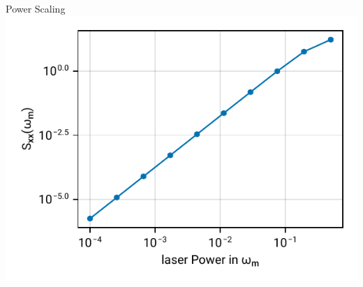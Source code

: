 \documentclass{beamer}
\begin{document}
\begin{frame}{Power Scaling}
	\centering
	\includegraphics{figures/03 power sweep.pdf}
\end{frame}


{
	\begin{frame}[plain]{}\end{frame}
}
\end{document}
